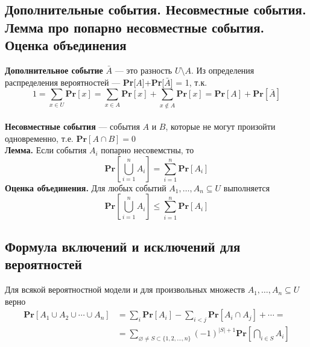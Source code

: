 \documentclass[a4paper]{article}
\begin{document}


\subsection{Дополнительные события. Несовместные события. Лемма про попарно несовместные события. Оценка объединения}
\textbf{Дополнительное событие} $\bar{A}$ — это разность $U\setminus A$. Из определения распределения вероятностей — \textbf{Pr}[$A$]+\textbf{Pr}[$\bar{A}$] = 1, т.к. $$1=\sum_{x \in U} \textbf{Pr}[x]=\sum_{x \in A} \textbf{Pr}[x]+\sum_{x \notin A} \textbf{Pr}[x]=\textbf{Pr}[A]+\textbf{Pr}[\bar{A}]$$\\[2mm]
\indent\textbf{Несовместные события} — события $A$ и $B$, которые не могут произойти одновременно, т.е. $\textbf{Pr}[A\cap B]=0$\\[2mm]
\indent\textbf{Лемма.} Если события $A_i$ попарно несовемстны, то $$\textbf{Pr}\left[\bigcup_{i=1}^n A_i\right]=\sum_{i=1}^n \textbf{Pr}[A_i]$$
\indent\textbf{Оценка объединения.} Для любых событий $A_1,\ldots, A_n\subseteq U$ выполняется $$\textbf{Pr}\left[\bigcup_{i=1}^n A_i\right]\leqslant\sum_{i=1}^n \textbf{Pr}[A_i]$$

\subsection{Формула включений и исключений для вероятностей}
Для всякой вероятностной модели и для произвольных множеств $A_1, \ldots, A_n \subseteq U$ верно $$
\begin{aligned}
\textbf{Pr}\left[A_1 \cup A_2 \cup \cdots \cup A_n\right] & =\sum_i \textbf{Pr}\left[A_i\right]-\sum_{i<j} \textbf{Pr}\left[A_i \cap A_j\right]+\cdots= \\
& =\sum_{\varnothing \neq S \subset\{1,2, \ldots, n\}}(-1)^{|S|+1} \textbf{Pr}\left[\bigcap_{i \in S} A_i\right]
\end{aligned}$$
\end{document}
